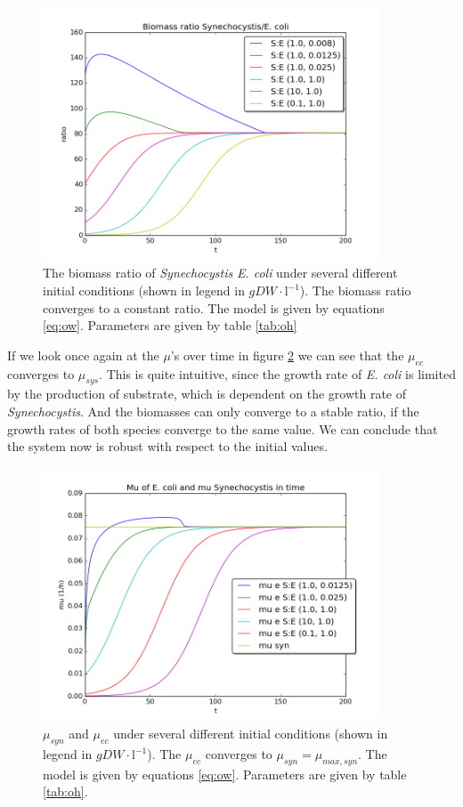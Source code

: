 \documentclass[10pt]{report}
\begin{document}
\begin{figure}[!ht]
 \begin{center}  
     \includegraphics[width=10cm]{independent_flask_ratios.png}
     \caption{The biomass ratio of \textit{Synechocystis} \textit{E. coli} under several different initial conditions (shown in legend in $gDW\cdot \text{l}^{-1}$). The biomass ratio converges to a constant ratio. The model is given by equations \ref{eq:ow}. Parameters are given by table \ref{tab:oh}}
    \label{fig:oneratio}
    \end{center}
\end{figure}

If we look once again at the $\mu$'s over time in figure \ref{fig:onemu} we can see that the $\mu_{ec}$ converges to $\mu_{sys}$. This is quite intuitive, since the growth rate of \textit{E. coli} is limited by the production of substrate, which is dependent on the growth rate of \textit{Synechocystis}. And the biomasses can only converge to a stable ratio, if the growth rates of both species converge to the same value. 
We can conclude that the system now is robust with respect to the initial values.

\begin{figure}[!ht]
 \begin{center}  
     \includegraphics[width=10cm]{independent_flask_mus.png}
     \caption{$\mu_{syn}$ and $\mu_{ec}$ under several different initial conditions (shown in legend in $gDW\cdot \text{l}^{-1}$). The $\mu_{ec}$ converges to $\mu_{syn}=\mu_{max,syn}$. The model is given by equations \ref{eq:ow}. Parameters are given by table \ref{tab:oh}.}
    \label{fig:onemu}
    \end{center}
\end{figure}
\end{document}
